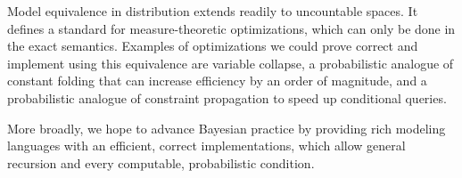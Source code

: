 Model equivalence in distribution extends readily to uncountable spaces.
It defines a standard for measure-theoretic optimizations, which can only be done in the exact semantics.
Examples of optimizations we could prove correct and implement using this equivalence are variable collapse, a probabilistic analogue of constant folding that can increase efficiency by an order of magnitude, and a probabilistic analogue of constraint propagation to speed up conditional queries.

More broadly, we hope to advance Bayesian practice by providing rich modeling languages with an efficient, correct implementations, which allow general recursion and every computable, probabilistic condition.


